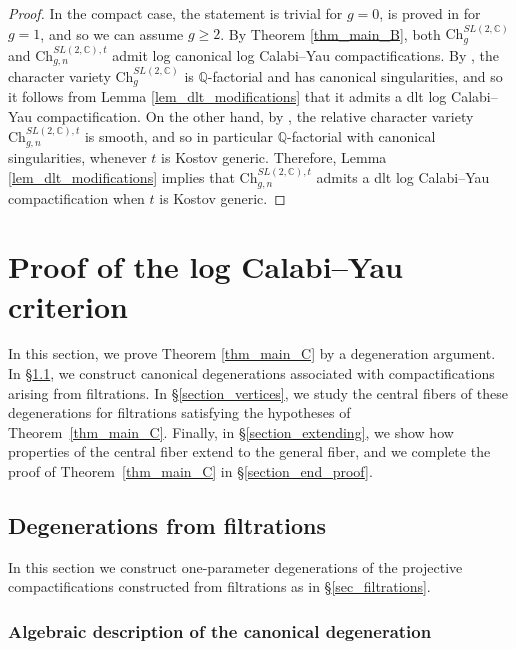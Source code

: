 \documentclass[12pt,letterpaper, reqno]{amsart}
\theoremstyle{defstyle} \newtheorem{definition}[theorem]{Definition}
\theoremstyle{remark}
\numberwithin{equation}{section}
\numberwithin{figure}{section}
\newcommand{\CC} {\mathbb{C}}
\newcommand{\QQ} {\mathbb{Q}}
\begin{document}
\begin{proof} In the compact case,  the statement is trivial for $g=0$, is proved in
\cite[Theorem E]{mauri2022geometric}  
for $g=1$, and so we can assume $g \geq 2$.
By Theorem \ref{thm_main_B}, both $\mathrm{Ch}_g^{SL(2,\CC)}$ and $\mathrm{Ch}_{g,n}^{SL(2,\CC),t}$
admit log canonical log Calabi--Yau compactifications. By \cite[Corollary 1.2 -- Theorem 1.3]{bellamy2023symplectic}, the character variety $\mathrm{Ch}_g^{SL(2,\CC)}$ is $\QQ$-factorial and has canonical singularities, and so it follows from Lemma \ref{lem_dlt_modifications} that it admits a dlt log Calabi--Yau compactification. 
On the other hand, by \cite[Proposition 4.5]{simpson2016dual}, the relative character variety $\mathrm{Ch}_{g,n}^{SL(2,\CC),t}$ is smooth, and so in particular $\QQ$-factorial with canonical singularities, whenever $t$ is Kostov generic. Therefore, Lemma \ref{lem_dlt_modifications} 
implies that $\mathrm{Ch}_{g,n}^{SL(2,\CC),t}$ admits a dlt log Calabi--Yau 
compactification when $t$ is Kostov generic.
\end{proof}


\section{Proof of the log Calabi--Yau criterion}
\label{section_proof}


In this section, we prove Theorem \ref{thm_main_C} by a degeneration argument.
In \S\ref{section_degeneration}, we construct canonical degenerations associated with compactifications arising from filtrations. In \S\ref{section_vertices}, we study the central fibers of these degenerations for filtrations satisfying the hypotheses of Theorem~\ref{thm_main_C}. Finally, in \S\ref{section_extending}, we show how properties of the central fiber extend to the general fiber, and we complete the proof of Theorem~\ref{thm_main_C} in \S\ref{section_end_proof}.



\subsection{Degenerations from filtrations}
\label{section_degeneration}
In this section we construct one-parameter degenerations of the projective compactifications constructed from filtrations as in \S\ref{sec_filtrations}.

\subsubsection{Algebraic description of the canonical degeneration}
\end{document}
